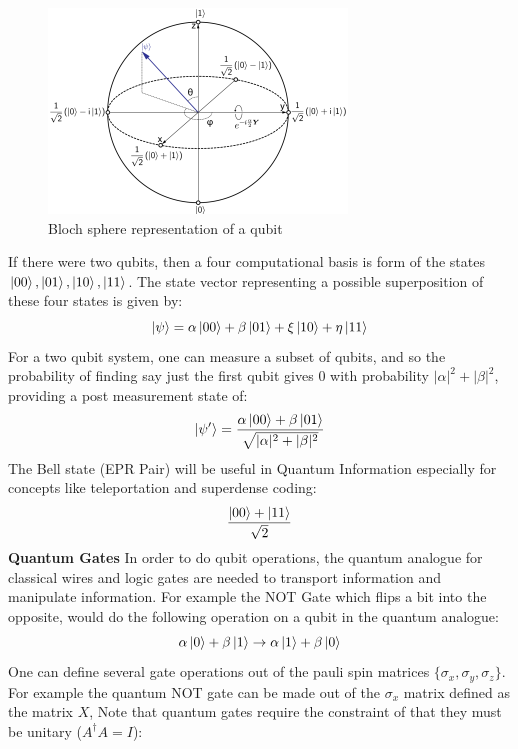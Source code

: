 \begin{figure}[htb]
    \centering
    \includegraphics{1_Intro/Figures/bloch_sphere.png}
    \caption{Bloch sphere representation of a qubit}
    \label{fig:my_label}
\end{figure}
If there were two qubits, then a four computational basis is form of the states $\ket{00}, \ket{01}, \ket{10}, \ket{11}$. The state vector representing a possible superposition of these four states is given by: 
\begin{equation}
    \ket{\psi} = \alpha \ket{00} + \beta \ket{01} + \xi \ket{10} + \eta \ket{11}
\end{equation}
For a two qubit system, one can measure a subset of qubits, and so the probability of finding say just the first qubit gives $0$ with probability $|\alpha|^2 + |\beta|^2$, providing a post measurement state of:
\begin{equation}
    \ket{\psi '} = \frac{\alpha \ket{00} + \beta \ket{01}}{\sqrt{|\alpha|^2 + |\beta|^2}}
\end{equation}
The Bell state (EPR Pair) will be useful in Quantum Information especially for concepts like teleportation and superdense coding: 
\begin{equation}
    \frac{\ket{00}+ \ket{11}}{\sqrt{2}}
\end{equation}
\textbf{Quantum Gates} \newline
In order to do qubit operations, the quantum analogue for classical wires and logic gates are needed to transport information and manipulate information. For example the NOT Gate which flips a bit into the opposite, would do the following operation on a qubit in the quantum analogue: 
\begin{equation}
    \alpha \ket{0} + \beta \ket{1} \rightarrow \alpha \ket{1} + \beta \ket{0}
\end{equation}
One can define several gate operations out of the pauli spin matrices $\{ \sigma_{x}, \sigma_{y}, \sigma_{z} \}$. For example the quantum NOT gate can be made out of the $\sigma_{x}$ matrix defined as the matrix $X$, Note that quantum gates require the constraint of that they must be unitary ($A^{\dagger}A = I$): 

